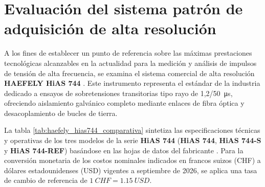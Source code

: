 \section{Evaluación del sistema patrón de adquisición de alta resolución} \label{sec:haefely_hias744}

A los fines de establecer un punto de referencia sobre las máximas prestaciones tecnológicas alcanzables en la actualidad para la medición y análisis de impulsos de tensión de alta frecuencia, se examina el sistema comercial de alta resolución \textbf{HAEFELY HiAS 744} \cite{haefely_brochure}. Este instrumento representa el estándar de la industria dedicado a ensayos de sobretensiones transitorias tipo rayo de \qty[parse-numbers=false]{1,2/50}{\micro\second}, ofreciendo aislamiento galvánico completo mediante enlaces de fibra óptica y desacoplamiento de bucles de tierra.

La tabla \ref{tab:haefely_hias744_comparativa} sintetiza las especificaciones técnicas y operativas de los tres modelos de la serie \textbf{HiAS 744} (\textbf{HiAS 744}, \textbf{HiAS 744-S} y \textbf{HiAS 744-REF}) basándose en las hojas de datos del fabricante \cite{haefely_datasheet}. Para la conversión monetaria de los costos nominales indicados en francos suizos (CHF) a dólares estadounidenses (USD) vigentes a septiembre de 2026, se aplica una tasa de cambio de referencia de $\qty{1}{CHF} = \qty{1,15}{USD}$.

